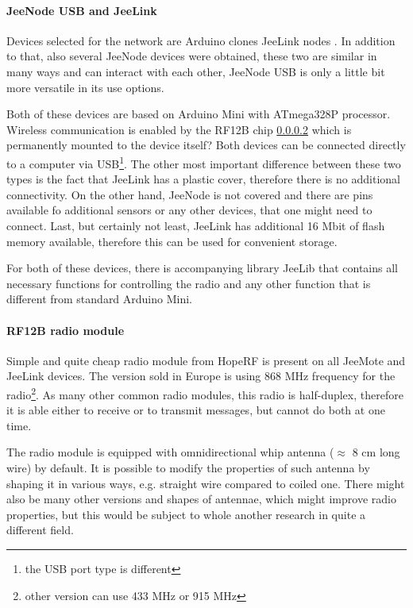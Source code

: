\documentclass[
  print, %
  table,   %
  nolof,     %
  nolot,     %
           oneside
]{fithesis3}
\begin{document}
  \paragraph{JeeNode USB and JeeLink}\label{par:jeeLink} %
  Devices selected for the network are Arduino clones JeeLink nodes \cite{JeeLink}. In addition to that, also several JeeNode devices \cite{JeeNode} were obtained, these two are similar in many ways and can interact with each other, JeeNode USB is only a little bit more versatile in its use options.

  Both of these devices are based on Arduino Mini \cite{ArduinoMini}
  with ATmega328P processor. Wireless communication is enabled by the RF12B chip \ref{par:radio} \cite{RF12B}
  which is permanently mounted to the device itself? Both devices can be connected directly to a computer via USB\footnote{the USB port type is different}. The other most important difference between these two types is the fact that JeeLink has a plastic cover, therefore there is no additional connectivity. On the other hand, JeeNode is not covered and there are pins available fo additional sensors or any other devices, that one might need to connect. Last, but certainly not least, JeeLink has additional 16 Mbit of flash memory \cite{JeeLink}
  available, therefore this can be used for convenient storage.

  For both of these devices, there is accompanying library JeeLib \cite{JeeLib}
  that contains all necessary functions for controlling the radio and any other function that is different from standard Arduino Mini.
  \paragraph{RF12B radio module}\label{par:radio} %
  Simple and quite cheap radio module from HopeRF \cite{RF12B}
  is present on all JeeMote and JeeLink devices. The version sold in Europe is using 868 MHz frequency for the radio\footnote{other version can use 433 MHz or 915 MHz}. As many other common radio modules, this radio is half-duplex, therefore it is able either to receive or to transmit messages, but cannot do both at one time.

  The radio module is equipped with omnidirectional whip antenna ($\approx$ 8 cm long wire) by default. It is possible to modify the properties of such antenna by shaping it in various ways, e.g. straight wire compared to coiled one. There might also be many other versions and shapes of antennae, which might improve radio properties, but this would be subject to whole another research in quite a different field.
\end{document}
